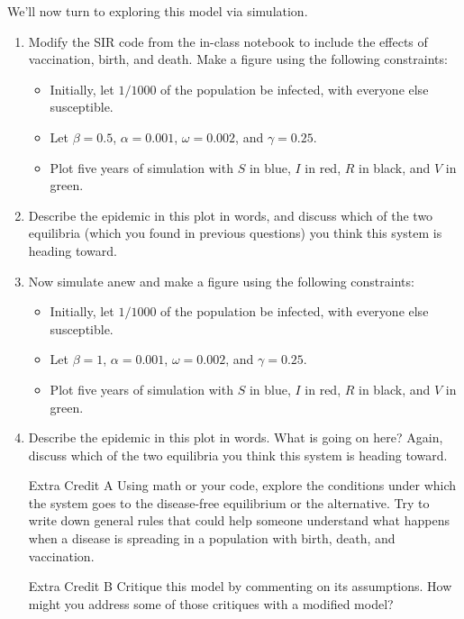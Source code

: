 \documentclass[11pt,onecolumn,superscriptaddress,notitlepage]{article}
\begin{document}
We'll now turn to exploring this model via simulation. 
\begin{enumerate}[resume]
	\item Modify the SIR code from the in-class notebook to include the effects of vaccination, birth, and death. Make a figure using the following constraints:
	\begin{itemize}
		\item Initially, let $1/1000$ of the population be infected, with everyone else susceptible. 
		\item Let $\beta=0.5$, $\alpha=0.001$, $\omega=0.002$, and $\gamma = 0.25$.
		\item Plot five years of simulation with $S$ in blue, $I$ in red, $R$ in black, and $V$ in green. 
	\end{itemize}
	\item Describe the epidemic in this plot in words, and discuss which of the two equilibria (which you found in previous questions) you think this system is heading toward.
	\item Now simulate anew and make a figure using the following constraints:
	\begin{itemize}
		\item Initially, let $1/1000$ of the population be infected, with everyone else susceptible. 
		\item Let $\beta=1$, $\alpha=0.001$, $\omega=0.002$, and $\gamma = 0.25$.
		\item Plot five years of simulation with $S$ in blue, $I$ in red, $R$ in black, and $V$ in green. 
	\end{itemize}
	\item Describe the epidemic in this plot in words. What is going on here? Again, discuss which of the two equilibria you think this system is heading toward. 
	\vspace{1in}
	\item [Extra Credit A] Using math or your code, explore the conditions under which the system goes to the disease-free equilibrium or the alternative. Try to write down general rules that could help someone understand what happens when a disease is spreading in a population with birth, death, and vaccination. 
	\item [Extra Credit B] Critique this model by commenting on its assumptions. How might you address some of those critiques with a modified model? 
\end{enumerate}

\end{document}
